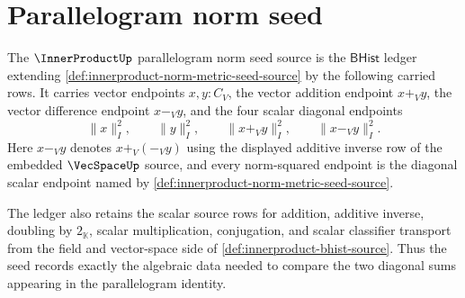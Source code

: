 \section{Parallelogram norm seed}
\label{sec:innerproduct-parallelogram-norm-seed}

\begin{definition}
\label{def:innerproduct-parallelogram-norm-seed-source}
The $\InnerProductUp$ parallelogram norm seed source is the $\mathsf{BHist}$
ledger extending \autoref{def:innerproduct-norm-metric-seed-source} by the
following carried rows. It carries vector endpoints $x,y:C_V$, the vector
addition endpoint $x+_V y$, the vector difference endpoint $x-_V y$, and the
four scalar diagonal endpoints
$$
\|x\|_{I}^{2},\qquad
\|y\|_{I}^{2},\qquad
\|x+_V y\|_{I}^{2},\qquad
\|x-_V y\|_{I}^{2}.
$$
Here $x-_V y$ denotes $x+_V(-_V y)$ using the displayed additive inverse row
of the embedded $\VecSpaceUp$ source, and every norm-squared endpoint is the
diagonal scalar endpoint named by
\autoref{def:innerproduct-norm-metric-seed-source}.

The ledger also retains the scalar source rows for addition, additive inverse,
doubling by $2_{\mathbb{K}}$, scalar multiplication, conjugation, and scalar
classifier transport from the field and vector-space side of
\autoref{def:innerproduct-bhist-source}. Thus the seed records exactly the
algebraic data needed to compare the two diagonal sums appearing in the
parallelogram identity.
\end{definition}

